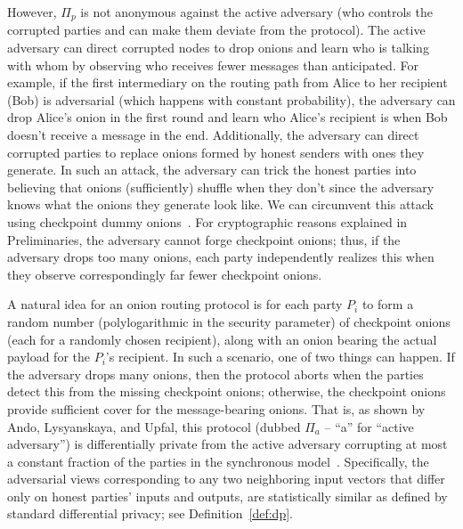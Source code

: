 \documentclass[runningheads,a4paper]{llncs}
\begin{document}
However, $\Pi_p$ is not anonymous against the active adversary (who controls the corrupted parties and can make them deviate from the protocol). The active adversary can direct corrupted nodes to drop onions and learn who is talking with whom by observing who receives fewer messages than anticipated. For example, if the first intermediary on the routing path from Alice to her recipient (Bob) is adversarial (which happens with constant probability), the adversary can drop Alice's onion in the first round and learn who Alice's recipient is when Bob doesn't receive a message in the end. Additionally, the adversary can direct corrupted parties to replace onions formed by honest senders with ones they generate. In such an attack, the adversary can trick the honest parties into believing that onions (sufficiently) shuffle when they don't since the adversary knows what the onions they generate look like. We can circumvent this attack using checkpoint dummy onions~\cite{ICALP:AndLysUpf18,ando2019complexity}. For cryptographic reasons explained in Preliminaries, the adversary cannot forge checkpoint onions; thus, if the adversary drops too many onions, each party independently realizes this when they observe correspondingly far fewer checkpoint onions. 

A natural idea for an onion routing protocol is for each party $P_i$ to form a random number (polylogarithmic in the security parameter) of checkpoint onions (each for a randomly chosen recipient), along with an onion bearing the actual payload for the $P_i$'s recipient. In such a scenario, one of two things can happen. If the adversary drops many onions, then the protocol aborts when the parties detect this from the missing checkpoint onions; otherwise, the checkpoint onions provide sufficient cover for the message-bearing onions. That is, as shown by Ando, Lysyanskaya, and Upfal, this protocol (dubbed $\Pi_a$ -- ``a'' for ``active adversary'') is differentially private from the active adversary corrupting at most a constant fraction of the parties in the synchronous model~\cite{ICALP:AndLysUpf18}. Specifically, the adversarial views corresponding to any two neighboring input vectors that differ only on honest parties' inputs and outputs, are statistically similar as defined by standard differential privacy; see Definition~\ref{def:dp}. 
\end{document}
